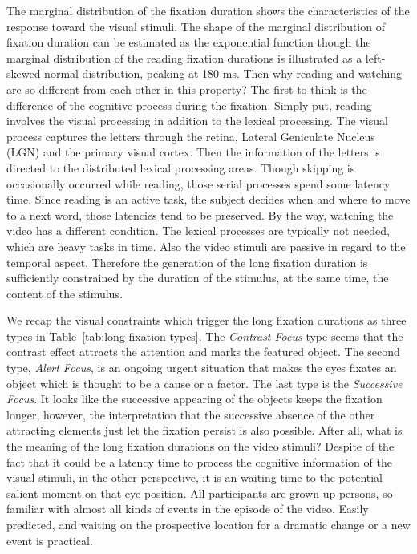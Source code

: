 \documentclass[10pt,letterpaper]{article}
\begin{document}
The marginal distribution of the fixation duration shows the characteristics of the response toward the visual stimuli. The shape of the marginal distribution of fixation duration can be estimated as the exponential function though the marginal distribution of the reading fixation durations is illustrated as a left-skewed normal distribution, peaking at 180 ms. Then why reading and watching are so different from each other in this property? The first to think is the difference of the cognitive process during the fixation. Simply put, reading involves the visual processing in addition to the lexical processing. The visual process captures the letters through the retina, Lateral Geniculate Nucleus (LGN) and the primary visual cortex. Then the information of the letters is directed to the distributed lexical processing areas. Though skipping is occasionally occurred while reading, those serial processes spend some latency time. Since reading is an active task, the subject decides when and where to move to a next word, those latencies tend to be preserved. By the way, watching the video has a different condition. The lexical processes are typically not needed, which are heavy tasks in time. Also the video stimuli are passive in regard to the temporal aspect. Therefore the generation of the long fixation duration is sufficiently constrained by the duration of the stimulus, at the same time, the content of the stimulus. 

We recap the visual constraints which trigger the long fixation durations as three types in Table~\ref{tab:long-fixation-types}. The \textit{Contrast Focus} type seems that the contrast effect attracts the attention and marks the featured object. The second type, \textit{Alert Focus}, is an ongoing urgent situation that makes the eyes fixates an object which is thought to be a cause or a factor. The last type is the \textit{Successive Focus}. It looks like the successive appearing of the objects keeps the fixation longer, however, the interpretation that the successive absence of the other attracting elements just let the fixation persist is also possible. After all, what is the meaning of the long fixation durations on the video stimuli? Despite of the fact that it could be a latency time to process the cognitive information of the visual stimuli, in the other perspective, it is an waiting time to the potential salient moment on that eye position. All participants are grown-up persons, so familiar with almost all kinds of events in the episode of the video. Easily predicted, and waiting on the prospective location for a dramatic change or a new event is practical.
\end{document}
